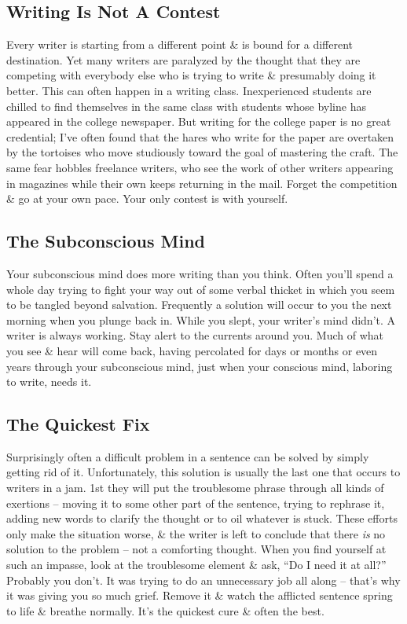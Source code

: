 \documentclass{article}
\begin{document}
\subsection{Writing Is Not A Contest}
Every writer is starting from a different point \& is bound for a different destination. Yet many writers are paralyzed by the thought that they are competing with everybody else who is trying to write \& presumably doing it better. This can often happen in a writing class. Inexperienced students are chilled to find themselves in the same class with students whose byline has appeared in the college newspaper. But writing for the college paper is no great credential; I've often found that the hares who write for the paper are overtaken by the tortoises who move studiously toward the goal of mastering the craft. The same fear hobbles freelance writers, who see the work of other writers appearing in magazines while their own keeps returning in the mail. Forget the competition \& go at your own pace. Your only contest is with yourself.

\subsection{The Subconscious Mind}
Your subconscious mind does more writing than you think. Often you'll spend a whole day trying to fight your way out of some verbal thicket in which you seem to be tangled beyond salvation. Frequently a solution will occur to you the next morning when you plunge back in. While you slept, your writer's mind didn't. A writer is always working. Stay alert to the currents around you. Much of what you see \& hear will come back, having percolated for days or months or even years through your subconscious mind, just when your conscious mind, laboring to write, needs it.

\subsection{The Quickest Fix}
Surprisingly often a difficult problem in a sentence can be solved by simply getting rid of it. Unfortunately, this solution is usually the last one that occurs to writers in a jam. 1st they will put the troublesome phrase through all kinds of exertions -- moving it to some other part of the sentence, trying to rephrase it, adding new words to clarify the thought or to oil whatever is stuck. These efforts only make the situation worse, \& the writer is left to conclude that there \textit{is} no solution to the problem -- not a comforting thought. When you find yourself at such an impasse, look at the troublesome element \& ask, ``Do I need it at all?'' Probably you don't. It was trying to do an unnecessary job all along -- that's why it was giving you so much grief. Remove it \& watch the afflicted sentence spring to life \& breathe normally. It's the quickest cure \& often the best.
\end{document}
